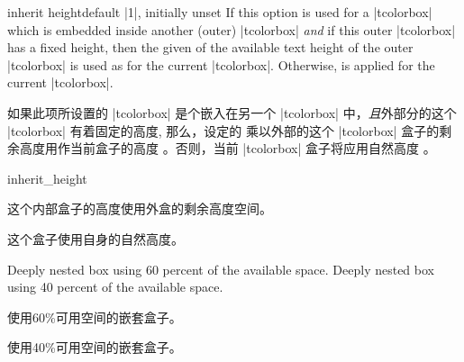 \begin{docTcbKey}[][doc new={2017-06-28}]{inherit height}{}{default |1|, initially unset}
If this option is used for a |tcolorbox| which is embedded inside
another (outer) |tcolorbox| \emph{and} if this outer |tcolorbox| has
a fixed height, then the given  of the available text height
of the outer |tcolorbox| is used as  for the current
|tcolorbox|.
Otherwise,  is applied for the current
|tcolorbox|.

如果此项所设置的 |tcolorbox| 是个嵌入在另一个%
|tcolorbox| 中，\emph{且}外部分的这个 |tcolorbox| 有着固定的高度, 那么，设定的  乘以外部的这个 |tcolorbox| 盒子的剩余高度用作当前盒子的高度 。否则，当前 |tcolorbox| 盒子将应用自然高度  。

\begin{exdispExample}{inherit_height}

\begin{tcolorbox}[title=外部盒子指定高度为4cm,height=4cm]
\begin{tcolorbox}[title=Inner box,nobeforeafter,inherit height]
这个内部盒子的高度使用外盒的剩余高度空间。
\end{tcolorbox}
\end{tcolorbox}

\begin{tcolorbox}[title=外部盒子使用自然高度]
\begin{tcolorbox}[title=Inner box,nobeforeafter,inherit height]
这个盒子使用自身的自然高度。
\end{tcolorbox}
\end{tcolorbox}

Deeply nested box using 60 percent of the available space.
Deeply nested box using 40 percent of the available space.
\begin{tcolorbox}[title=外部盒子指定高度为5cm,height=5cm]
\begin{tcolorbox}[title=内部盒子,nobeforeafter,inherit height]
\begin{tcolorbox}[colframe=red,beforeafter skip=0pt,inherit height=0.6]
    使用60\%可用空间的嵌套盒子。
\end{tcolorbox}
\begin{tcolorbox}[colframe=red,beforeafter skip=0pt,inherit height=0.4]
    使用40\%可用空间的嵌套盒子。
\end{tcolorbox}
\end{tcolorbox}
\end{tcolorbox}
\end{exdispExample}
\end{docTcbKey}





